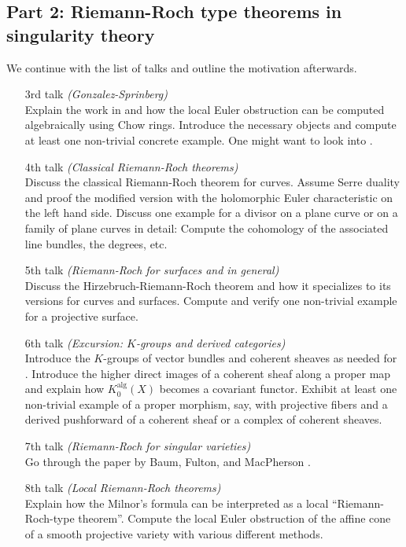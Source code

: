 \documentclass[a4paper]{article}
\begin{document}
\subsection*{Part 2: Riemann-Roch type theorems in singularity theory}
We continue with the list of talks and outline the motivation afterwards.
\begin{enumerate}
\item[3rd talk] \emph{(Gonzalez-Sprinberg)} \\
    Explain the work in \cite{Gonzalez81} and 
    how the local Euler obstruction can be computed algebraically using 
    Chow rings. Introduce the necessary objects and compute at least one 
    non-trivial concrete example. One might want to look into \cite{Zhang16}. 
\item[4th talk] \emph{(Classical Riemann-Roch theorems)}  \\
    Discuss the classical Riemann-Roch 
    theorem for curves. Assume Serre duality and proof the modified version 
    with the holomorphic Euler characteristic on the left hand side. 
    Discuss one example for a divisor on a plane curve or on a family of plane curves in 
    detail: Compute the cohomology of the associated line bundles, the 
    degrees, etc. 
\item[5th talk] \emph{(Riemann-Roch for surfaces and in general)} \\
    Discuss the Hirzebruch-Riemann-Roch 
    theorem and how it specializes to its versions for curves and surfaces. 
    Compute and verify one non-trivial example for a projective surface. 
\item[6th talk] \emph{(Excursion: $K$-groups and derived categories)} \\
    Introduce the $K$-groups of 
    vector bundles and coherent sheaves as needed for \cite{BaumFultonMacPherson79}. 
    Introduce the higher direct images of a coherent sheaf along a proper map and 
    explain how $K_0^{\mathrm{alg}}(X)$ becomes a covariant functor. Exhibit at least 
    one non-trivial example of a proper morphism, say, with projective fibers and 
    a derived pushforward of a coherent sheaf or a complex of coherent sheaves. 
  \item[7th talk] \emph{(Riemann-Roch for singular varieties)} \\
    Go through the paper by Baum, Fulton, and MacPherson \cite{BaumFultonMacPherson79}. 
\item[8th talk] \emph{(Local Riemann-Roch theorems)}  \\
    Explain how the Milnor's formula can 
    be interpreted as a local ``Riemann-Roch-type theorem''. Compute the local 
    Euler obstruction of the affine cone of a smooth projective variety with 
    various different methods.
\end{enumerate}
\end{document}
